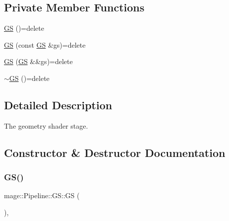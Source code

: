 \subsection*{Private Member Functions}
\begin{DoxyCompactItemize}
\item 
\hyperlink{structmage_1_1_pipeline_1_1_g_s_afe788f2debaadc21084c0957425cd4e9}{GS} ()=delete
\item 
\hyperlink{structmage_1_1_pipeline_1_1_g_s_a8c655c42c955940780afa1147a20f4dd}{GS} (const \hyperlink{structmage_1_1_pipeline_1_1_g_s}{GS} \&gs)=delete
\item 
\hyperlink{structmage_1_1_pipeline_1_1_g_s_a6e4029c83232ec735d6cf4709866adf7}{GS} (\hyperlink{structmage_1_1_pipeline_1_1_g_s}{GS} \&\&gs)=delete
\item 
\hyperlink{structmage_1_1_pipeline_1_1_g_s_adfc786dc4a692b0d3d04e45e08c4783a}{$\sim$\+GS} ()=delete
\end{DoxyCompactItemize}


\subsection{Detailed Description}
The geometry shader stage. 

\subsection{Constructor \& Destructor Documentation}
\hypertarget{structmage_1_1_pipeline_1_1_g_s_afe788f2debaadc21084c0957425cd4e9}{}\label{structmage_1_1_pipeline_1_1_g_s_afe788f2debaadc21084c0957425cd4e9} 
\subsubsection{\texorpdfstring{G\+S()}{GS()}\hspace{0.1cm}{\footnotesize\ttfamily [1/3]}}
{\footnotesize\ttfamily mage\+::\+Pipeline\+::\+G\+S\+::\+GS (\begin{DoxyParamCaption}{ }\end{DoxyParamCaption})\hspace{0.3cm}{\ttfamily [private]}, {\ttfamily [delete]}}

\hypertarget{structmage_1_1_pipeline_1_1_g_s_a8c655c42c955940780afa1147a20f4dd}{}\label{structmage_1_1_pipeline_1_1_g_s_a8c655c42c955940780afa1147a20f4dd} 
